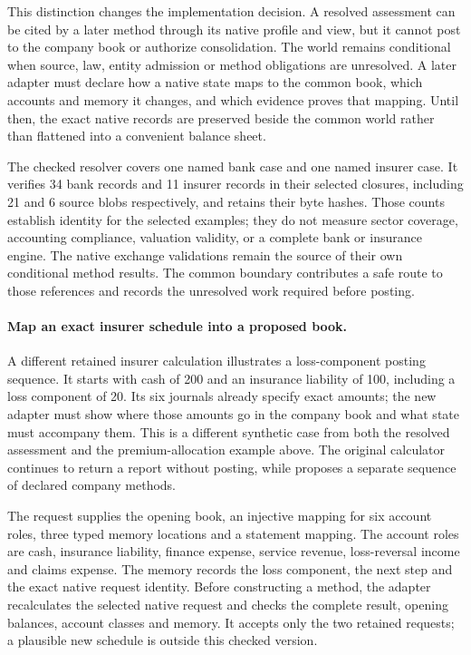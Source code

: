 This distinction changes the implementation decision. A resolved assessment
can be cited by a later method through its native profile and view, but it
cannot post to the company book or authorize consolidation. The world remains
conditional when source, law, entity admission or method obligations are
unresolved. A later adapter must declare how a native state maps to the common
book, which accounts and memory it changes, and which evidence proves that
mapping. Until then, the exact native records are preserved beside the common
world rather than flattened into a convenient balance sheet.

The checked resolver covers one named bank case and one named insurer case.
It verifies 34 bank records and 11 insurer records in their selected closures,
including 21 and 6 source blobs respectively, and retains their byte hashes.
Those counts establish identity for the selected examples; they do not measure
sector coverage, accounting compliance, valuation validity, or a complete bank
or insurance engine. The native exchange validations remain the source of their
own conditional method results. The common boundary contributes a safe route
to those references and records the unresolved work required before posting.





\paragraph{Map an exact insurer schedule into a proposed book.}
A different retained insurer calculation illustrates a loss-component posting sequence.
It starts with cash of 200 and an insurance liability of 100, including a loss
component of 20. Its six journals already specify exact amounts; the new
adapter must show where those amounts go in the company book and what state
must accompany them. This is a different synthetic case from both the resolved
assessment and the premium-allocation example above. The original calculator continues to return a report without
posting, while  proposes a separate sequence of
declared company methods.

The request supplies the opening book, an injective mapping for six account
roles, three typed memory locations and a statement mapping. The account roles
are cash, insurance liability, finance expense, service revenue, loss-reversal
income and claims expense. The memory records the loss component, the next
step and the exact native request identity. Before constructing a method, the
adapter recalculates the selected native request and checks the complete result,
opening balances, account classes and memory. It accepts only the two retained
requests; a plausible new schedule is outside this checked version.

